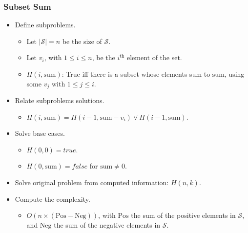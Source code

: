 \documentclass{beamer}
\begin{document}
\begin{frame}%
\frametitle{Subset Sum}

\footnotesize

\begin{itemize}

\item Define subproblems.
\begin{itemize}
\footnotesize
\item<1-> Let $|\mathcal{S}| = n$ be the size of $\mathcal{S}$.
\vspace{0.08cm}
\item<2-> Let $v_i$, with $1 \le i \le n$, be the $i^{\textrm{th}}$ element of the set.
\vspace{0.08cm}
\item<3-> $H(i, \textrm{sum})$: True iff there is a subset whose elements sum to $\textrm{sum}$, using some $v_j$ with $1 \le j \le i$.
\end{itemize}

\vspace{0.15cm}

\item<4-> Relate subproblems solutions.
\begin{itemize}
\footnotesize
\item<4-> $H(i, \textrm{sum}) = H(i - 1, \textrm{sum} - v_i) \vee H(i - 1, \textrm{sum})$.
\end{itemize}

\vspace{0.15cm}

\item<5-> Solve base cases.
\begin{itemize}
\footnotesize
\item<5-> $H(0, 0) = true$.
\vspace{0.08cm}
\item<5-> $H(0, \textrm{sum}) = false$ for $\textrm{sum} \ne 0$.
\end{itemize}

\vspace{0.2cm}

\item<6-> Solve original problem from computed information: $H(n, k)$.

\vspace{0.15cm}

\item<7-> Compute the complexity.
\begin{itemize}
\footnotesize
\item<7> $O(n\times(\textrm{Pos} - \textrm{Neg}))$, with $\textrm{Pos}$ the sum of the positive elements in $\mathcal{S}$,
and $\textrm{Neg}$ the sum of the negative elements in $\mathcal{S}$.
\end{itemize}

\end{itemize}

\end{frame}
\end{document}
